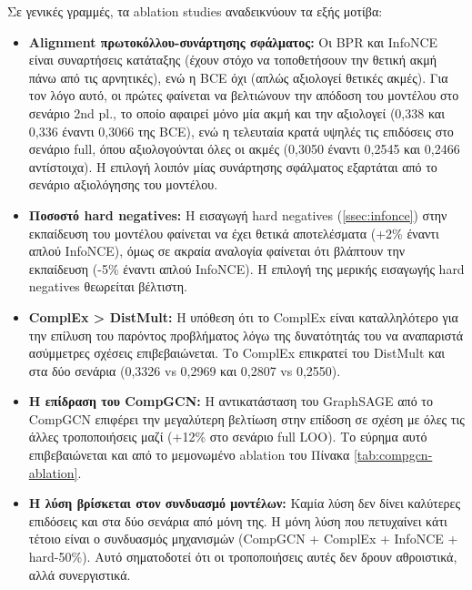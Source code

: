 Σε γενικές γραμμές, τα ablation studies αναδεικνύουν τα εξής μοτίβα:
\begin{itemize}
    \item \textbf{Alignment πρωτοκόλλου-συνάρτησης σφάλματος:} Οι BPR και InfoNCE είναι συναρτήσεις κατάταξης (έχουν στόχο να τοποθετήσουν την θετική ακμή πάνω από τις αρνητικές), ενώ η BCE όχι (απλώς αξιολογεί θετικές ακμές). Για τον λόγο αυτό, οι πρώτες φαίνεται να βελτιώνουν την απόδοση του μοντέλου στο σενάριο 2nd pl., το οποίο αφαιρεί μόνο μία ακμή και την αξιολογεί (0,338 και 0,336 έναντι 0,3066 της BCE), ενώ η τελευταία κρατά υψηλές τις επιδόσεις στο σενάριο full, όπου αξιολογούνται όλες οι ακμές (0,3050 έναντι 0,2545 και 0,2466 αντίστοιχα). Η επιλογή λοιπόν μίας συνάρτησης σφάλματος εξαρτάται από το σενάριο αξιολόγησης του μοντέλου.
    \item \textbf{Ποσοστό hard negatives:} Η εισαγωγή hard negatives (\autoref{ssec:infonce}) στην εκπαίδευση του μοντέλου φαίνεται να έχει θετικά αποτελέσματα (+2\% έναντι απλού InfoNCE), όμως σε ακραία αναλογία φαίνεται ότι βλάπτουν την εκπαίδευση (-5\% έναντι απλού InfoNCE). Η επιλογή της μερικής εισαγωγής hard negatives θεωρείται βέλτιστη.
    \item \textbf{ComplEx > DistMult:} Η υπόθεση ότι το ComplEx είναι καταλληλότερο για την επίλυση του παρόντος προβλήματος λόγω της δυνατότητάς του να αναπαριστά ασύμμετρες σχέσεις επιβεβαιώνεται. Το ComplEx επικρατεί του DistMult και στα δύο σενάρια (0,3326 vs 0,2969 και 0,2807 vs 0,2550).
    \item \textbf{Η επίδραση του CompGCN:} Η αντικατάσταση του GraphSAGE από το CompGCN επιφέρει την μεγαλύτερη βελτίωση στην επίδοση σε σχέση με όλες τις άλλες τροποποιήσεις μαζί (+12\% στο σενάριο full LOO). Το εύρημα αυτό επιβεβαιώνεται και από το μεμονωμένο ablation του Πίνακα \ref{tab:compgcn-ablation}.
    \item \textbf{Η λύση βρίσκεται στον συνδυασμό μοντέλων:} Καμία λύση δεν δίνει καλύτερες επιδόσεις και στα δύο σενάρια από μόνη της. Η μόνη λύση που πετυχαίνει κάτι τέτοιο είναι ο συνδυασμός μηχανισμών (CompGCN + ComplEx + InfoNCE + hard-50\%). Αυτό σηματοδοτεί ότι οι τροποποιήσεις αυτές δεν δρουν αθροιστικά, αλλά συνεργιστικά.
\end{itemize}

